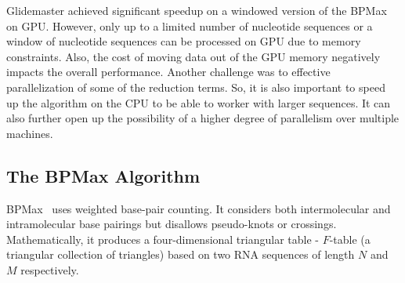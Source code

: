 Glidemaster\cite{Gildemaster2020} achieved significant speedup on a windowed version of the BPMax on GPU. However, only up to a limited number of nucleotide sequences or a window of nucleotide sequences can be processed on GPU due to memory constraints. Also, the cost of moving data out of the GPU memory negatively impacts the overall performance. Another challenge was to effective parallelization of some of the reduction terms. So, it is also important to speed up the algorithm on the CPU to be able to worker with larger sequences. It can also further open up the possibility of a higher degree of parallelism over multiple machines.

\subsection{The BPMax Algorithm}

BPMax~\cite{EbrahimpourBoroojeny2021} uses weighted base-pair counting.  It considers both intermolecular and intramolecular base pairings but disallows pseudo-knots or crossings. Mathematically, it produces a four-dimensional triangular table - $F$-table (a triangular collection of triangles) based on two RNA sequences of length $N$ and $M$ respectively.

